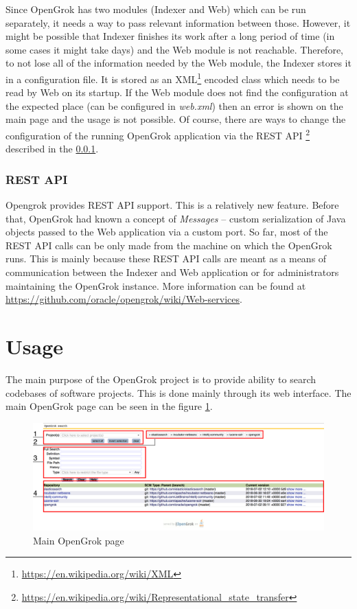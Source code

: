 Since OpenGrok has two modules (Indexer and Web) which can be run separately, it needs a way to pass relevant
information between those. However, it might be possible that Indexer finishes its work after a long period of time
(in some cases it might take days) and the Web module is not reachable. Therefore, to not lose all of the information
needed by the Web module, the Indexer stores it in a configuration file. It is stored as an
XML\footnote{\url{https://en.wikipedia.org/wiki/XML}} encoded class which needs to be read by Web on its startup.
If the Web module does not find the configuration at the expected place (can be configured in \textit{web.xml}) then an
error is shown on the main page and the usage is not possible. Of course, there are ways to change the configuration
of the running OpenGrok application via the REST API \footnote{\url{https://en.wikipedia.org/wiki/Representational\_state\_transfer}}
described in the \ref{opengrok_rest}.

\subsubsection{REST API}
\label{opengrok_rest}

Opengrok provides REST API support. This is a relatively new feature. Before that, OpenGrok had known a concept of
\textit{Messages} – custom serialization of Java objects passed to the Web application via a custom port.
So far, most of the REST API calls can be only made from the machine on which the OpenGrok runs.
This is mainly because these REST API calls are meant as a means of communication between the Indexer and Web application
or for administrators maintaining the OpenGrok instance. More information can be found at
\url{https://github.com/oracle/opengrok/wiki/Web-services}.

\section{Usage}
\label{opengrok_usage}
The main purpose of the OpenGrok project is to provide ability to search codebases of software projects. This is done
mainly through its web interface. The main OpenGrok page can be seen in the figure \ref{opengrok_main}.

\begin{figure}[htbp]
    \centering
    \includegraphics[width=145mm]{../img/opengrok_main.png}
    \caption{Main OpenGrok page}
    \label{opengrok_main}
\end{figure}

